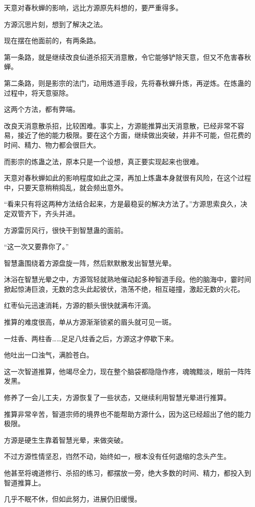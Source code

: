 \begin{this_body}
天意对春秋蝉的影响，远比方源原先料想的，要严重得多。

方源沉思片刻，想到了解决之法。

现在摆在他面前的，有两条路。

第一条路，就是继续改良仙道杀招天消意散，令它能够铲除天意，但又不危害春秋蝉。

第二条路，则是影宗的法门，动用炼道手段，先将春秋蝉升炼，再逆炼。在炼蛊的过程中，将天意驱除。

这两个方法，都有弊端。

改良天消意散杀招，比较困难。事实上，方源能推算出天消意散，已经非常不容易，接近了他的能力极限。要在这个方面，继续做出突破，并非不可能，但花费的时间、精力、物力都会很巨大。

而影宗的炼蛊之法，原本只是一个设想，真正要实现起来也很难。

天意对春秋蝉如此的影响程度如此之深，再加上炼蛊本身就很有风险，在这个过程中，只要天意稍稍捣乱，就会频出意外。

“看来只有将这两种方法结合起来，方是最稳妥的解决方法了。”方源思索良久，决定双管齐下，齐头并进。

方源雷厉风行，很快干到智慧蛊的面前。

“这一次又要靠你了。”

智慧蛊围绕着方源盘旋一阵，然后默默散发出智慧光晕。

沐浴在智慧光晕之中，方源驾轻就熟地催动起多种智道手段。他的脑海中，霎时间掀起惊涛巨浪，无数的念头此起彼伏，浩荡不绝，相互碰撞，激起无数的火花。

红枣仙元迅速消耗，方源的额头很快就满布汗滴。

推算的难度很高，单从方源渐渐锁紧的眉头就可见一斑。

一炷香、两柱香……足足八炷香之后，方源这才停歇下来。

他吐出一口浊气，满脸苍白。

这一次智道推算，他竭尽全力，现在整个脑袋都隐隐作疼，魂魄黯淡，眼前一阵阵发黑。

修养了一会儿工夫，方源恢复了一些状态，又继续利用智慧光晕进行推算。

推算非常辛苦，智道宗师的境界也不能帮助方源什么，因为这已经超出了他的能力极限。

方源是硬生生靠着智慧光晕，来做突破。

不过方源性情坚忍，岿然不动，始终如一，根本没有任何退缩的念头产生。

他甚至将魂道修行、杀招的练习，都摆放一旁，绝大多数的时间、精力，都投入到智道推算上。

几乎不眠不休，但如此努力，进展仍旧缓慢。


\end{this_body}
